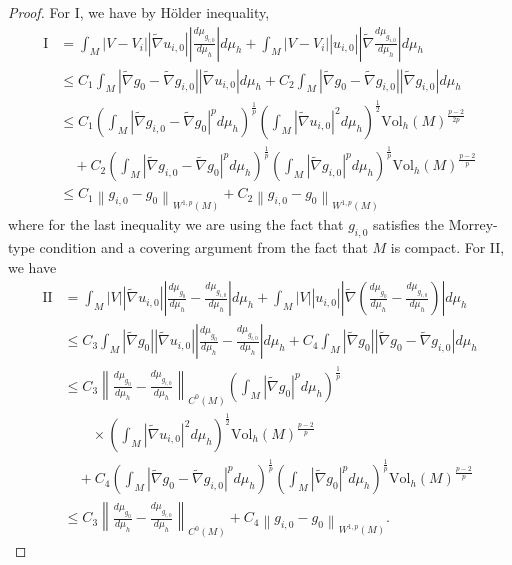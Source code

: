 \documentclass[12pt]{amsart}
\theoremstyle{plain}
\theoremstyle{plain}
\theoremstyle{definition}
\theoremstyle{remark}
\numberwithin{equation}{subsection}
\newcommand{\hdel}{\tilde{\nabla}}
\begin{document}
\begin{proof}
    For I, we have by H\"older inequality,
    \begin{align*}
        \text{I} &= \int_M |V - V_i||\hdel u_{i,0}|\left|\frac{d\mu_{g_{i,0}}}{d\mu_h}\right|d\mu_h + \int_M |V - V_i||u_{i,0}|\left|\hdel\frac{d\mu_{g_{i,0}}}{d\mu_h}\right|d\mu_h \nonumber \\
        &\leq C_1\int_M |\hdel g_0 - \hdel g_{i,0}||\hdel u_{i,0}|d\mu_h + C_2\int_M |\hdel g_0 - \hdel g_{i,0}||\hdel g_{i,0}|d\mu_h \nonumber \\
        &\leq C_1\left(\int_M |\hdel g_{i,0} - \hdel g_0|^pd\mu_h\right)^\frac{1}{p}\left(\int_M |\hdel u_{i,0}|^2d\mu_h\right)^\frac{1}{2}\text{Vol}_h(M)^\frac{p-2}{2p} \nonumber \\
        &\quad + C_2\left(\int_M |\hdel g_{i,0} - \hdel g_0|^pd\mu_h\right)^\frac{1}{p}\left(\int_M |\hdel g_{i,0}|^pd\mu_h\right)^\frac{1}{p}\text{Vol}_h(M)^\frac{p-2}{p} \nonumber \\
        &\leq C_1\left\lVert g_{i,0} - g_0\right\rVert_{W^{1,p}(M)} + C_2\left\lVert g_{i,0} - g_0\right\rVert_{W^{1,p}(M)}
    \end{align*}
    where for the last inequality we are using the fact that $g_{i,0}$ satisfies the Morrey-type condition and a covering argument from the fact that $M$ is compact. For II, we have
    \begin{align*}
        \text{II} &= \int_M |V||\hdel u_{i,0}|\left|\frac{d\mu_{g_0}}{d\mu_h} - \frac{d\mu_{g_{i,0}}}{d\mu_h}\right|d\mu_h + \int_M |V||u_{i,0}|\left|\hdel\left(\frac{d\mu_{g_0}}{d\mu_h}-\frac{d\mu_{g_{i,0}}}{d\mu_h}\right)\right|d\mu_h \nonumber \\
        &\leq C_3\int_M |\hdel g_0||\hdel u_{i,0}|\left|\frac{d\mu_{g_0}}{d\mu_h} - \frac{d\mu_{g_{i,0}}}{d\mu_h}\right|d\mu_h + C_4\int_M |\hdel g_0||\hdel g_0 - \hdel g_{i,0}|d\mu_h \nonumber \\
        &\leq C_3\left\lVert \frac{d\mu_{g_0}}{d\mu_h} - \frac{d\mu_{g_{i,0}}}{d\mu_h}\right\rVert_{C^0(M)}\left(\int_M |\hdel g_0|^pd\mu_h\right)^\frac{1}{p} \nonumber \\
        &\qquad \times\left(\int_M |\hdel u_{i,0}|^2d\mu_h\right)^\frac{1}{2}\text{Vol}_h(M)^\frac{p-2}{p} \nonumber \\
        &\quad + C_4\left(\int_M |\hdel g_0 - \hdel g_{i,0}|^pd\mu_h\right)^\frac{1}{p}\left(\int_M |\hdel g_0|^pd\mu_h\right)^\frac{1}{p}\text{Vol}_h(M)^\frac{p-2}{p} \nonumber \\
        &\leq C_3\left\lVert \frac{d\mu_{g_0}}{d\mu_h} - \frac{d\mu_{g_{i,0}}}{d\mu_h}\right\rVert_{C^0(M)} + C_4\left\lVert g_{i,0} - g_0\right\rVert_{W^{1,p}(M)}.

\end{align*}
\end{proof}
\end{document}
